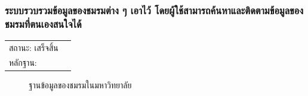 \documentclass[14pt,oneside,openright,a4paper]{cpe-thai-project}
\begin{document}
\newpage

\subsubsection{ระบบรวบรวมข้อมูลของชมรมต่าง ๆ เอาไว้ โดยผู้ใช้สามารถค้นหาและติดตามข้อมูลของชมรมที่ตนเองสนใจได้}
\begin{tabular}{@{}p{2cm}p{10cm}@{}}
  สถานะ: เสร็จสิ้น \\
  หลักฐาน: & \\
  \end{tabular}
\begin{figure}[!h]\centering
  \setlength{\fboxrule}{0.5mm} %
  \setlength{\fboxsep}{0.5cm}
  \caption{ฐานข้อมูลของชมรมในมหาวิทยาลัย}\label{fig:FeedPages}
\end{figure}

\newpage
\end{document}
